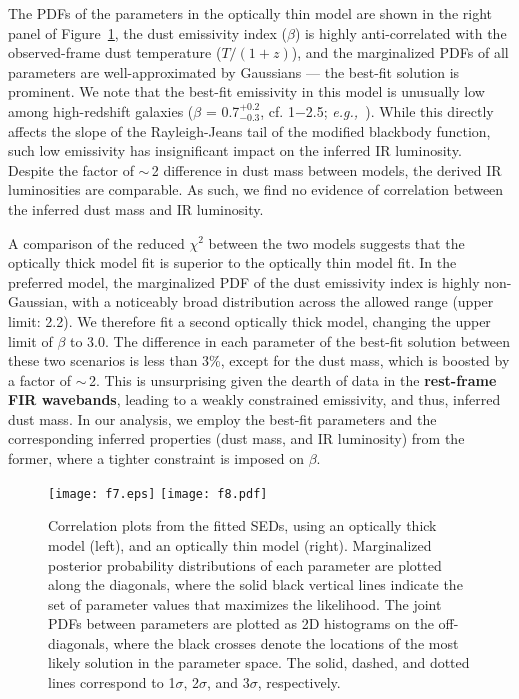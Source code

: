 \documentclass[iop, revtex4]{emulateapj}
\newcommand{\eg}{{\sl e.g.,~}}
\begin{document}
The PDFs of the parameters in the optically thin model are shown in the right panel of Figure~\ref{fig:sedlikelihood}, the dust emissivity index ($\beta$) is highly anti-correlated with the observed-frame dust temperature ($T/(1+z)$), and the marginalized PDFs of all parameters are well-approximated by Gaussians --- the best-fit solution is prominent.
We note that the best-fit emissivity in this model is unusually low among high-redshift galaxies ($\beta$ = 0.7$^{+0.2}_{-0.3}$, cf. 1$-$2.5; \eg \citealt[][and references therein]{Casey12a}). While this directly affects the slope of the Rayleigh-Jeans tail of the modified blackbody function, such low emissivity has insignificant impact on the inferred IR luminosity.
Despite the factor of $\sim$\,2 difference
in dust mass
between models, the derived IR luminosities are comparable. As such, we find no evidence of correlation between the inferred dust mass and IR luminosity. 

A comparison of the reduced $\chi^2$ between the two models suggests that the optically thick model fit is superior to the optically thin model fit. In the preferred model, the marginalized PDF of the dust emissivity index is highly non-Gaussian, with a noticeably broad distribution across
the allowed range (upper limit: 2.2). We therefore fit a second optically thick model, changing the upper limit of $\beta$ to 3.0. The difference in each
parameter of the best-fit solution between these two scenarios is less than 3\%, except for the dust mass, which is boosted by a factor of $\sim$\,2. This is
unsurprising given the dearth of data in the {\bf rest-frame FIR wavebands}, leading to a weakly constrained emissivity, and thus, inferred dust mass.
In our analysis, we employ the best-fit parameters and the corresponding inferred properties (dust mass, and IR luminosity) from the former, where a tighter constraint is imposed on $\beta$.


\begin{figure}[!tbph]
\centering
\hspace{-1.1cm}
\texttt{[image: f7.eps]}
\hspace{-1cm}
\texttt{[image: f8.pdf]}
\hspace{-1.1cm}
\caption{Correlation plots from the fitted SEDs, using an optically thick
model (left), and an optically thin model (right). Marginalized posterior probability
distributions of each
parameter are plotted along the diagonals, where the solid black vertical lines indicate the set of parameter values that maximizes the likelihood. The joint PDFs between parameters are plotted as 2D histograms on the off-diagonals, where the black crosses denote the
locations of the most likely solution in the parameter space. The solid, dashed, and dotted lines correspond to 1$\sigma$, 2$\sigma$, and $3\sigma$, respectively. 
\label{fig:sedlikelihood}}
\end{figure}
\end{document}
